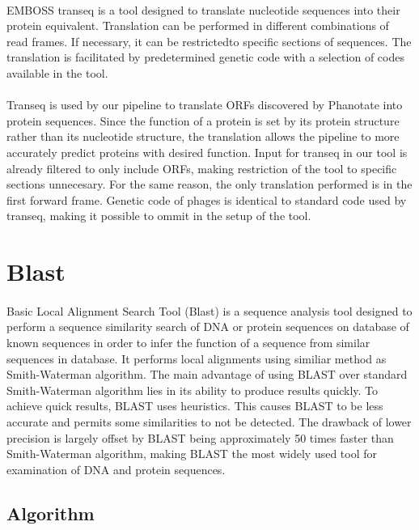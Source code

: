 \paragraph*{}
EMBOSS transeq is a tool designed to translate nucleotide sequences into their protein equivalent. Translation can be performed in different combinations of read frames. If necessary, it can be restrictedto specific sections of sequences. The translation is facilitated by predetermined genetic code with a selection of codes available in the tool.
\paragraph*{}
Transeq is used by our pipeline to translate ORFs discovered by Phanotate into protein sequences. Since the function of a protein is set by its protein structure rather than its nucleotide structure, the translation allows the pipeline to more accurately predict proteins with desired function. Input for transeq in our tool is already filtered to only include ORFs, making restriction of the tool to specific sections unnecesary. For the same reason, the only translation performed is in the first forward frame. Genetic code of phages is identical to standard code used by transeq, making it possible to ommit in the setup of the tool.

\section{Blast}
\paragraph*{}
Basic Local Alignment Search Tool (Blast) is a sequence analysis tool designed to perform a sequence similarity search of DNA or protein sequences on database of known sequences in order to infer the function of a sequence from similar sequences in database. It performs local alignments using similiar method as Smith-Waterman algorithm. The main advantage of using BLAST over standard Smith-Waterman algorithm lies in its ability to produce results quickly. To achieve quick results, BLAST uses heuristics. This causes BLAST to be less accurate and permits some similarities to not be detected. The drawback of lower precision is largely offset by BLAST being approximately 50 times faster than Smith-Waterman algorithm, making BLAST the most widely used tool for examination of DNA and protein sequences.
\subsection{Algorithm}
